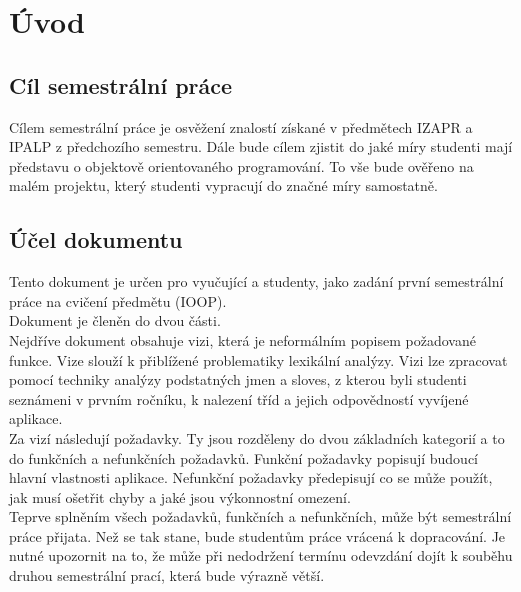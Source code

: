 
\section{Úvod}

\subsection{Cíl semestrální práce} 
Cílem semestrální práce je osvěžení znalostí získané v předmětech IZAPR a IPALP z předchozího semestru. 
Dále bude cílem zjistit do jaké míry studenti mají představu o objektově orientovaného programování.
To vše bude ověřeno na malém projektu, který studenti vypracují do značné míry samostatně. 
 

\subsection{Účel dokumentu}
Tento dokument je určen pro vyučující a studenty, jako zadání první semestrální práce  na cvičení předmětu  (IOOP).\\

Dokument je členěn do dvou části.\\

Nejdříve dokument obsahuje vizi, která je neformálním popisem požadované funkce. Vize slouží k přiblížené problematiky lexikální analýzy. Vizi lze zpracovat pomocí techniky analýzy podstatných jmen a sloves, z kterou byli studenti seznámeni v prvním ročníku, k nalezení tříd a jejich odpovědností vyvíjené aplikace.\\


Za vizí následují požadavky. Ty jsou rozděleny do dvou základních kategorií a to do funkčních a nefunkčních požadavků. 
Funkční požadavky popisují budoucí hlavní vlastnosti aplikace.
Nefunkční požadavky předepisují co se může použít, jak musí ošetřit chyby a jaké jsou výkonnostní omezení.\\


Teprve splněním všech požadavků, funkčních a nefunkčních, může být semestrální práce přijata. Než se tak stane, bude studentům práce vrácená k dopracování. Je nutné upozornit na to, že může  při nedodržení termínu odevzdání dojít k souběhu druhou semestrální prací, která bude výrazně větší.


%
